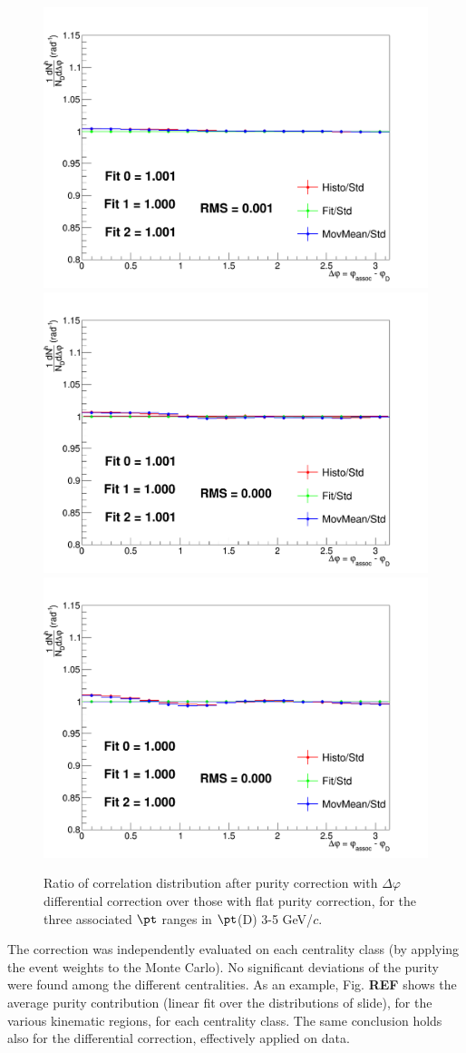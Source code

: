 \begin{figure}
\centering
{\includegraphics[width=0.45\linewidth]{figuresVsCent/Global/Purity/PurityCheck1.png}}
{\includegraphics[width=0.45\linewidth]{figuresVsCent/Global/Purity/PurityCheck2.png}} \\
{\includegraphics[width=0.45\linewidth]{figuresVsCent/Global/Purity/PurityCheck3.png}}
 \caption{Ratio of correlation distribution after purity correction with $\Delta\varphi$ differential correction over those with flat purity correction, for the three associated $\pt$ ranges in $\pt$(D) 3-5 GeV/$c$.}
\label{fig:PurityAppr}
\end{figure}

The correction was independently evaluated on each centrality class (by applying the event weights to the Monte Carlo).
No significant deviations of the purity were found among the different centralities.
As an example, Fig. {\bf REF} shows the average purity contribution (linear fit over the distributions of slide), for the various kinematic regions, for each centrality class. The same conclusion holds also for the differential correction, effectively applied on data.


